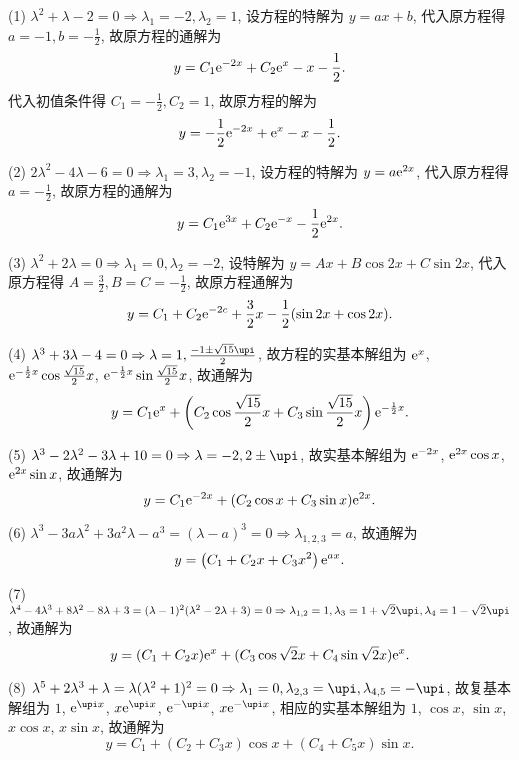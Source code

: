 \begin{solution}
  (1) $\lambda^2+\lambda-2=0\Rightarrow\lambda_1=-2,\lambda_2=1$, 
  设方程的特解为 $y=ax+b$, 代入原方程得 $a=-1,b=-\frac{1}{2}$, 故原方程的通解为
  \[y=C_1\mathrm{e}^{-2x}+C_2\mathrm{e}^x-x-\frac{1}{2}.\]
  代入初值条件得 $C_1=-\frac{1}{2},C_2=1$, 故原方程的解为
  \[y=-\frac{1}{2}\mathrm{e}^{-2x}+\mathrm{e}^x-x-\frac{1}{2}.\]

  (2) $2\lambda^2-4\lambda-6=0\Rightarrow\lambda_1=3,\lambda_2=-1$, 
  设方程的特解为 $y=a\mathrm{e}^{2x}$, 代入原方程得 $a=-\frac{1}{2}$, 故原方程的通解为
  \[y=C_1\mathrm{e}^{3x}+C_2\mathrm{e}^{-x}-\frac{1}{2}\mathrm{e}^{2x}.\]

  (3) $\lambda^2+2\lambda=0\Rightarrow\lambda_1=0,\lambda_2=-2$, 
  设特解为 $y=Ax+B\cos 2x+C\sin2x$, 代入原方程得 $A=\frac{3}{2},B=C=-\frac{1}{2}$, 故原方程通解为
  \[y=C_1+C_2\mathrm{e}^{-2c}+\frac{3}{2}x-\frac{1}{2}(\sin2x+\cos2x).\]

  (4) $\lambda^3+3\lambda-4=0\Rightarrow\lambda=1,\frac{-1\pm\sqrt{15}\upi}{2}$, 
  故方程的实基本解组为
  $\mathrm{e}^x$, $\mathrm{e}^{-\frac{1}{2}x}\cos\frac{\sqrt{15}}{2}x$, 
  $\mathrm{e}^{-\frac{1}{2}x}\sin\frac{\sqrt{15}}{2}x$, 故通解为
  \[y=C_1\mathrm{e}^x+\left(C_2\cos\frac{\sqrt{15}}{2}x+C_3\sin\frac{\sqrt{15}}{2}x\right)\mathrm{e}^{-\frac{1}{2}x}.\]

  (5) $\lambda^3-2\lambda^2-3\lambda+10=0\Rightarrow\lambda=-2,2\pm\upi$, 
  故实基本解组为 $\mathrm{e}^{-2x}$, $\mathrm{e}^{2x}\cos x$, $\mathrm{e}^{2x}\sin x$, 故通解为
  \[y=C_1\mathrm{e}^{-2x}+(C_2\cos x+C_3\sin x)\mathrm{e}^{2x}.\]

  (6) $\lambda^3-3a\lambda^2+3a^2\lambda-a^3=(\lambda-a)^3=0\Rightarrow\lambda_{1,2,3}=a$, 故通解为
  \[y=\left(C_1+C_2x+C_3x^2\right)\mathrm{e}^{ax}.\]

  (7) $\lambda^4-4\lambda^3+8\lambda^2-8\lambda+3=(\lambda-1)^2(\lambda^2-2\lambda+3)=0\Rightarrow\lambda_{1,2}=1,\lambda_3=1+\sqrt{2}\upi,\lambda_4=1-\sqrt{2}\upi$, 故通解为
  \[y=(C_1+C_2x)\mathrm{e}^x+(C_3\cos\sqrt{2}x+C_4\sin\sqrt{2}x)\mathrm{e}^x.\]

  (8) $\lambda^5+2\lambda^3+\lambda=\lambda(\lambda^2+1)^2=0\Rightarrow\lambda_1=0,\lambda_{2,3}=\upi,\lambda_{4,5}=-\upi$, 
  故复基本解组为 $1$, $\e^{\upi x}$, $x\e^{\upi x}$, $\e^{-\upi x}$, $x\e^{-\upi x}$, 
  相应的实基本解组为 $1$, $\cos x$, $\sin x$, $x\cos x$, $x\sin x$, 故通解为
  \[y=C_1+(C_2+C_3x)\cos x+(C_4+C_5x)\sin x.\]


\end{solution}

